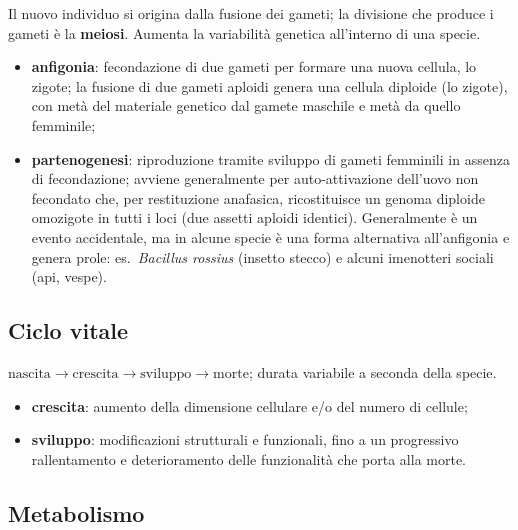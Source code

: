 Il nuovo individuo si origina dalla fusione dei gameti; la divisione che produce i gameti è la \textbf{meiosi}. Aumenta la variabilità genetica all'interno di una specie.
\begin{itemize}
  \item \textbf{anfigonia}: fecondazione di due gameti per formare una nuova cellula, lo zigote; la fusione di due gameti aploidi genera una cellula diploide (lo zigote), con metà del materiale genetico dal gamete maschile e metà da quello femminile;
  \item \textbf{partenogenesi}: riproduzione tramite sviluppo di gameti femminili in assenza di fecondazione; avviene generalmente per auto-attivazione dell'uovo non fecondato che, per restituzione anafasica, ricostituisce un genoma diploide omozigote in tutti i loci (due assetti aploidi identici). Generalmente è un evento accidentale, ma in alcune specie è una forma alternativa all'anfigonia e genera prole: es.\ \textit{Bacillus rossius} (insetto stecco) e alcuni imenotteri sociali (api, vespe).
\end{itemize}

\subsection{Ciclo vitale}

$\text{nascita} \rightarrow \text{crescita} \rightarrow \text{sviluppo} \rightarrow \text{morte}$; durata variabile a seconda della specie.
\begin{itemize}
  \item \textbf{crescita}: aumento della dimensione cellulare e/o del numero di cellule;
  \item \textbf{sviluppo}: modificazioni strutturali e funzionali, fino a un progressivo rallentamento e deterioramento delle funzionalità che porta alla morte.
\end{itemize}

\subsection{Metabolismo}

